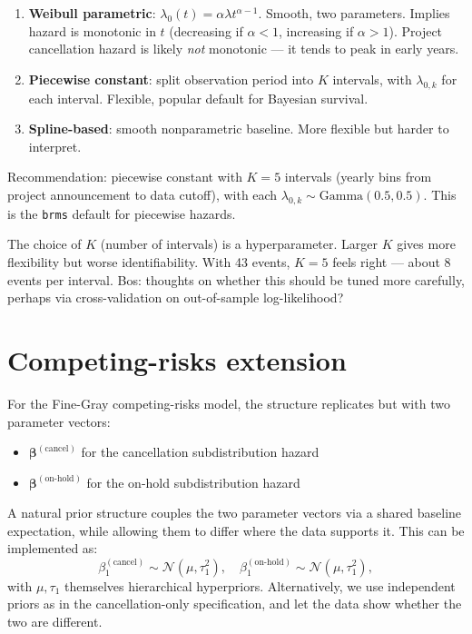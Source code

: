 \documentclass[11pt,a4paper]{article}
\newcommand{\N}{\mathcal{N}}
\newcommand{\Gam}{\mathrm{Gamma}}
\begin{document}
\begin{enumerate}
  \item \textbf{Weibull parametric}: $\lambda_0(t) = \alpha \lambda t^{\alpha-1}$. Smooth, two parameters. Implies hazard is monotonic in $t$ (decreasing if $\alpha < 1$, increasing if $\alpha > 1$). Project cancellation hazard is likely \emph{not} monotonic --- it tends to peak in early years.
  \item \textbf{Piecewise constant}: split observation period into $K$ intervals, with $\lambda_{0,k}$ for each interval. Flexible, popular default for Bayesian survival.
  \item \textbf{Spline-based}: smooth nonparametric baseline. More flexible but harder to interpret.
\end{enumerate}

Recommendation: piecewise constant with $K = 5$ intervals (yearly bins from project announcement to data cutoff), with each $\lambda_{0,k} \sim \Gam(0.5, 0.5)$. This is the \texttt{brms} default for piecewise hazards.

\begin{openquestion}
The choice of $K$ (number of intervals) is a hyperparameter. Larger $K$ gives more flexibility but worse identifiability. With 43 events, $K = 5$ feels right --- about 8 events per interval. Bos: thoughts on whether this should be tuned more carefully, perhaps via cross-validation on out-of-sample log-likelihood?
\end{openquestion}

\section{Competing-risks extension}

For the Fine-Gray competing-risks model, the structure replicates but with two parameter vectors:

\begin{itemize}
  \item $\bm\beta^{(\text{cancel})}$ for the cancellation subdistribution hazard
  \item $\bm\beta^{(\text{on-hold})}$ for the on-hold subdistribution hazard
\end{itemize}

A natural prior structure couples the two parameter vectors via a shared baseline expectation, while allowing them to differ where the data supports it. This can be implemented as:
\[
\beta_1^{(\text{cancel})} \sim \N(\mu, \tau_1^2), \quad \beta_1^{(\text{on-hold})} \sim \N(\mu, \tau_1^2),
\]
with $\mu, \tau_1$ themselves hierarchical hyperpriors. Alternatively, we use independent priors as in the cancellation-only specification, and let the data show whether the two are different.
\end{document}
